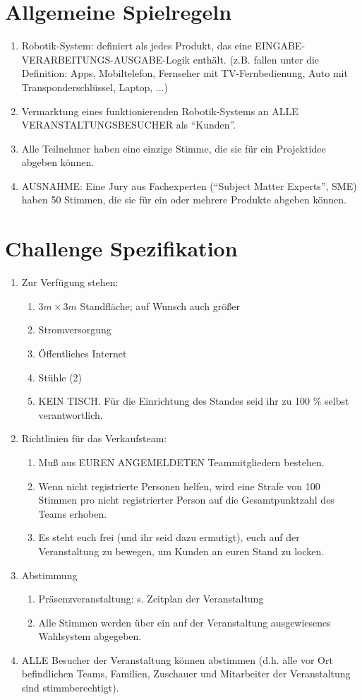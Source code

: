 \documentclass[a4paper,12pt]{article}
\begin{document}
\section{Allgemeine Spielregeln}
\begin{enumerate}
	\item  Robotik-System: definiert als jedes Produkt, das eine
		EINGABE-VERARBEITUNGS-AUSGABE-Logik enthält. (z.B. fallen unter
		die Definition: Apps, Mobiltelefon, Fernseher mit
		TV-Fernbedienung, Auto mit Transponderschlüssel, Laptop, ...)
	\item Vermarktung eines funktionierenden Robotik-Systems an ALLE
		VERANSTALTUNGSBESUCHER als "`Kunden"'.
	\item Alle Teilnehmer haben eine einzige Stimme, die sie für ein
		Projektidee abgeben können.
	\item AUSNAHME: Eine Jury aus Fachexperten ("`Subject Matter Experts"',
		SME) haben 50 Stimmen, die sie für ein oder mehrere Produkte
		abgeben können.
\end{enumerate}

\section{Challenge Spezifikation}
\begin{enumerate}
\item Zur Verfügung stehen:
	\begin{enumerate}
		\item $3 m \times 3 m$ Standfläche; auf Wunsch auch größer
		\item Stromversorgung
		\item Öffentliches Internet
		\item Stühle (2)
		\item KEIN TISCH. Für die Einrichtung des Standes seid ihr zu
			100 \% selbst verantwortlich.
	\end{enumerate}
	\item Richtlinien für das Verkaufsteam:
	\begin{enumerate}
		\item Muß aus EUREN ANGEMELDETEN Teammitgliedern bestehen.
		\item Wenn nicht registrierte Personen helfen, wird eine Strafe
			von 100 Stimmen pro nicht registrierter Person auf die
			Gesamtpunktzahl des Teams erhoben.
		\item Es steht euch frei (und ihr seid dazu ermutigt), euch
			auf der Veranstaltung zu bewegen, um Kunden an euren
			Stand zu locken.
	\end{enumerate}
	\item Abstimmung
        \begin{enumerate}
		\item Präsenzveranstaltung: s. Zeitplan der Veranstaltung
		\item Alle Stimmen werden über ein auf der Veranstaltung
			ausgewiesenes Wahlsystem abgegeben.
        \end{enumerate}
	\item ALLE Besucher der Veranstaltung können abstimmen (d.h. alle
		vor Ort befindlichen Teams, Familien, Zuschauer und Mitarbeiter
		der Veranstaltung sind stimmberechtigt).
\end{enumerate}
\end{document}
